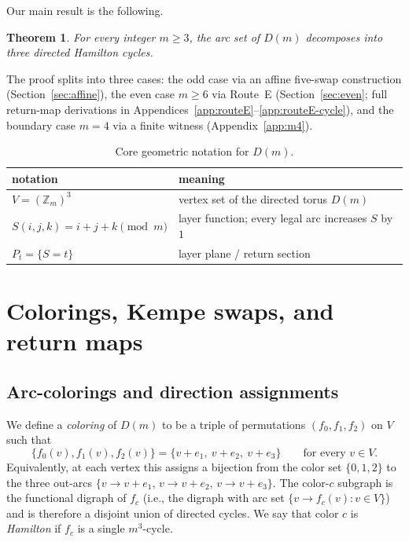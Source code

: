 \documentclass[11pt]{article}
\newtheorem{theorem}{Theorem}
\begin{document}
Our main result is the following.

\begin{theorem}\label{thm:main-all}
For every integer $m\ge 3$, the arc set of $D(m)$ decomposes into three directed Hamilton cycles.
\end{theorem}

The proof splits into three cases: the odd case via an affine five-swap construction (Section~\ref{sec:affine}), the even case $m\ge 6$ via Route~E (Section~\ref{sec:even}; full return-map derivations in Appendices~\ref{app:routeE}--\ref{app:routeE-cycle}), and the boundary case $m=4$ via a finite witness (Appendix~\ref{app:m4}).

\begin{table}[t]
\centering
\footnotesize
\begin{tabularx}{\textwidth}{@{}l>{\raggedright\arraybackslash}X@{}}
\toprule
notation & meaning \\
\midrule
$V=(\mathbb Z_m)^3$ & vertex set of the directed torus $D(m)$ \\
$S(i,j,k)=i+j+k\pmod m$ & layer function; every legal arc increases $S$ by $1$ \\
$P_t=\{S=t\}$ & layer plane / return section \\
\bottomrule
\end{tabularx}
\caption{Core geometric notation for $D(m)$.}
\label{tab:notation}
\end{table}

\section{Colorings, Kempe swaps, and return maps}\label{sec:prelim}

\subsection{Arc-colorings and direction assignments}
We define a \emph{coloring} of $D(m)$ to be a triple of permutations $(f_0,f_1,f_2)$ on $V$ such that
\[
\{f_0(v),f_1(v),f_2(v)\}=\{v+e_1,\ v+e_2,\ v+e_3\}
\qquad\text{for every }v\in V.
\]
Equivalently, at each vertex this assigns a bijection from the color set $\{0,1,2\}$ to the three out-arcs $\{v\to v+e_1,\, v\to v+e_2,\, v\to v+e_3\}$.
The color-$c$ subgraph is the functional digraph of $f_c$ (i.e., the digraph with arc set $\{v\to f_c(v):v\in V\}$) and is therefore a disjoint union of directed cycles.
We say that color $c$ is \emph{Hamilton} if $f_c$ is a single $m^3$-cycle.
\end{document}

